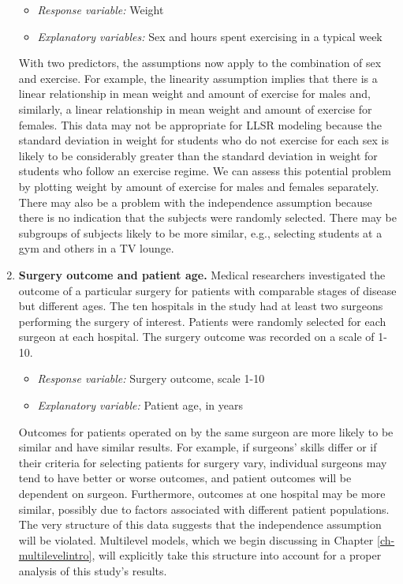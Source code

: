 \documentclass[
]{krantz}
\providecommand{\tightlist}{%
  \setlength{\itemsep}{0pt}\setlength{\parskip}{0pt}}
\begin{document}
\begin{enumerate}
  \begin{itemize}
  \tightlist
  \item
    \emph{Response variable:} Weight
  \item
    \emph{Explanatory variables:} Sex and hours spent exercising in a typical week
  \end{itemize}

  With two predictors, the assumptions now apply to the combination of sex and exercise. For example, the linearity assumption implies that there is a linear relationship in mean weight and amount of exercise for males and, similarly, a linear relationship in mean weight and amount of exercise for females. This data may not be appropriate for LLSR modeling because the standard deviation in weight for students who do not exercise for each sex is likely to be considerably greater than the standard deviation in weight for students who follow an exercise regime. We can assess this potential problem by plotting weight by amount of exercise for males and females separately. There may also be a problem with the independence assumption because there is no indication that the subjects were randomly selected. There may be subgroups of subjects likely to be more similar, e.g., selecting students at a gym and others in a TV lounge.
\item
  \textbf{Surgery outcome and patient age.} Medical researchers investigated the outcome of a particular surgery for patients with comparable stages of disease but different ages. The ten hospitals in the study had at least two surgeons performing the surgery of interest. Patients were randomly selected for each surgeon at each hospital. The surgery outcome was recorded on a scale of 1-10.

  \begin{itemize}
  \tightlist
  \item
    \emph{Response variable:} Surgery outcome, scale 1-10
  \item
    \emph{Explanatory variable:} Patient age, in years
  \end{itemize}

  Outcomes for patients operated on by the same surgeon are more likely to be similar and have similar results. For example, if surgeons' skills differ or if their criteria for selecting patients for surgery vary, individual surgeons may tend to have better or worse outcomes, and patient outcomes will be dependent on surgeon. Furthermore, outcomes at one hospital may be more similar, possibly due to factors associated with different patient populations. The very structure of this data suggests that the independence assumption will be violated. Multilevel models, which we begin discussing in Chapter \ref{ch-multilevelintro}, will explicitly take this structure into account for a proper analysis of this study's results.
\end{enumerate}
\end{document}

